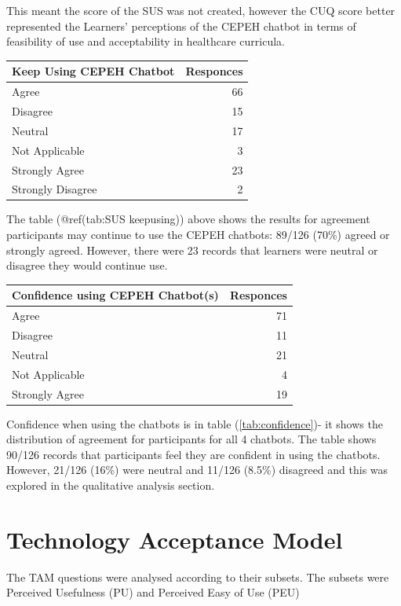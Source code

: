 \documentclass[a4paper, nobind]{templates/ociamthesis}
\begin{document}
This meant the score of the SUS was not created, however the CUQ score better represented the Learners' perceptions of the CEPEH chatbot in terms of feasibility of use and acceptability in healthcare curricula.

\begin{longtable}[]{@{}lr@{}}
\toprule()
Keep Using CEPEH Chatbot & Responces \\
\midrule()
\endhead
Agree & 66 \\
Disagree & 15 \\
Neutral & 17 \\
Not Applicable & 3 \\
Strongly Agree & 23 \\
Strongly Disagree & 2 \\
\bottomrule()
\end{longtable}

The table (@ref(tab:SUS keepusing)) above shows the results for agreement participants may
continue to use the CEPEH chatbots: 89/126 (70\%) agreed or strongly
agreed. However, there were 23 records that learners were neutral or
disagree they would continue use.

\begin{longtable}[]{@{}lr@{}}
\toprule()
Confidence using CEPEH Chatbot(s) & Responces \\
\midrule()
\endhead
Agree & 71 \\
Disagree & 11 \\
Neutral & 21 \\
Not Applicable & 4 \\
Strongly Agree & 19 \\
\bottomrule()
\end{longtable}

Confidence when using the chatbots is in table (\ref{tab:confidence})- it shows the distribution of agreement for participants for all
4 chatbots. The table shows 90/126 records that participants feel they
are confident in using the chatbots. However, 21/126 (16\%) were neutral
and 11/126 (8.5\%) disagreed and this was explored in the qualitative
analysis section.

\hypertarget{technology-acceptance-model}{%
\section{Technology Acceptance Model}\label{technology-acceptance-model}}

The TAM questions were analysed according to their subsets. The subsets
were Perceived Usefulness (PU) and Perceived Easy of Use (PEU)
\end{document}
